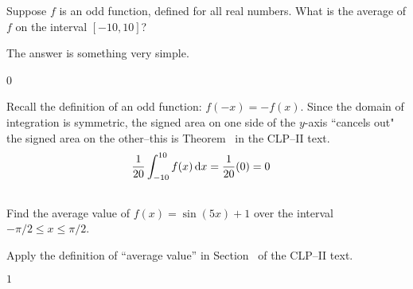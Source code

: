 \begin{question}
Suppose $f$ is an odd function, defined for all real numbers. What is the average of $f$ on the interval $[-10,10]$?
\end{question}
\begin{hint}
The answer is something very simple.
\end{hint}
\begin{answer}
0
\end{answer}
\begin{solution}
Recall the definition of an odd function: $f(-x)=-f(x)$. Since the domain of integration is symmetric, the signed area on one side of the $y$-axis ``cancels out" the signed area on the other--this is Theorem~ in the CLP--II text.
\begin{align*}\frac{1}{20}\int_{-10}^{10}f(x)\,\mathrm{d}x&=\frac{1}{20}(0)=0
\end{align*}
\end{solution}



\subsection*{\Procedural}

\begin{Mquestion}[2016Q3]
Find the average value of $f(x) = \sin(5x)+1$ over the interval $-\pi/2 \le x \le \pi/2 $.
\end{Mquestion}

\begin{hint}
Apply the definition of ``average value'' in Section~ of the
CLP--II text.
\end{hint}

\begin{answer}
$1$
\end{answer}

